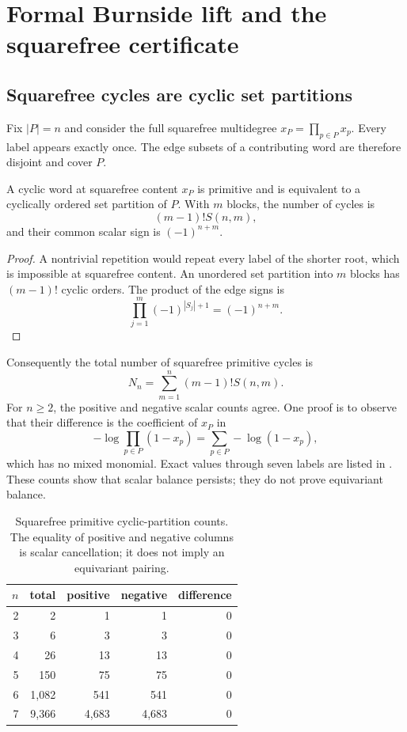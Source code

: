\section{Formal Burnside lift and the squarefree certificate}
\label{sec:burnside}

\subsection{Squarefree cycles are cyclic set partitions}

Fix $|P|=n$ and consider the full squarefree multidegree
$x_P=\prod_{p\in P}x_p$.  Every label appears exactly once.  The edge
subsets of a contributing word are therefore disjoint and cover $P$.

\begin{proposition}
\label{prop:cyclic-partition}
A cyclic word at squarefree content $x_P$ is primitive and is equivalent to a
cyclically ordered set partition of $P$.  With $m$ blocks, the number of
cycles is
\[
  (m-1)!S(n,m),
  \tag{4.1}
\]
and their common scalar sign is $(-1)^{n+m}$.
\end{proposition}

\begin{proof}
A nontrivial repetition would repeat every label of the shorter root, which
is impossible at squarefree content.  An unordered set partition into $m$
blocks has $(m-1)!$ cyclic orders.  The product of the edge signs is
\[
 \prod_{j=1}^m(-1)^{|S_j|+1}=(-1)^{n+m}.
\]
\end{proof}

Consequently the total number of squarefree primitive cycles is
\[
  N_n=\sum_{m=1}^n(m-1)!S(n,m).
  \tag{4.2}
\]
For $n\ge2$, the positive and negative scalar counts agree.  One proof is to
observe that their difference is the coefficient of $x_P$ in
\[
  -\log\prod_{p\in P}(1-x_p)
  =\sum_{p\in P}-\log(1-x_p),
  \tag{4.3}
\]
which has no mixed monomial.  Exact values through seven labels are listed in
.  These counts show that scalar balance persists;
they do not prove equivariant balance.

\begin{table}[t]
\centering
\caption{Squarefree primitive cyclic-partition counts.  The equality of
positive and negative columns is scalar cancellation; it does not imply an
equivariant pairing.}
\label{tab:squarefree-counts}
\begin{tabular}{rrrrr}
\toprule
$n$ & total & positive & negative & difference\\
\midrule
2 & 2 & 1 & 1 & 0\\
3 & 6 & 3 & 3 & 0\\
4 & 26 & 13 & 13 & 0\\
5 & 150 & 75 & 75 & 0\\
6 & 1,082 & 541 & 541 & 0\\
7 & 9,366 & 4,683 & 4,683 & 0\\
\bottomrule
\end{tabular}
\end{table}

